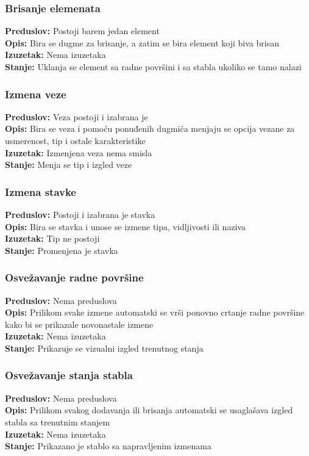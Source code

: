 \documentclass[a4paper]{article}
\begin{document}
\subsubsection{Brisanje elemenata}\noindent
\textbf{Preduslov: }Postoji barem jedan element \\
\textbf{Opis: }Bira se dugme za brisanje, a zatim se bira element koji biva brisan \\
\textbf{Izuzetak: }Nema izuzetaka \\ 
\textbf{Stanje: }Uklanja se element sa radne površini i sa stabla ukoliko se tamo nalazi 
\subsubsection{Izmena veze}\noindent
\textbf{Preduslov: }Veza postoji i izabrana je \\
\textbf{Opis: }Bira se veza i pomoću ponuđenih dugmića menjaju se opcija vezane za usmerenost, tip i ostale karakteristike \\
\textbf{Izuzetak: }Izmenjena veza nema smisla \\ 
\textbf{Stanje: } Menja se tip i izgled veze
\subsubsection{Izmena stavke}\noindent
\textbf{Preduslov: }Postoji i izabrana je stavka \\
\textbf{Opis: }Bira se stavka i unose se izmene tipa, vidljivosti ili naziva \\
\textbf{Izuzetak: }Tip ne postoji \\ 
\textbf{Stanje: }Promenjena je stavka 
\subsubsection{Osvežavanje radne površine}\noindent
\textbf{Preduslov: }Nema preduslova \\
\textbf{Opis: }Prilikom svake izmene automatski se vrši ponovno crtanje radne površine kako bi se prikazale novonastale izmene\\
\textbf{Izuzetak: }Nema izuzetaka \\ 
\textbf{Stanje: }Prikazuje se vizualni izgled trenutnog stanja 
\subsubsection{Osvežavanje stanja stabla}\noindent
\textbf{Preduslov: }Nema preduslova \\
\textbf{Opis: }Prilikom svakog dodavanja ili brisanja automatski se usaglašava izgled stabla sa trenutnim stanjem \\
\textbf{Izuzetak: }Nema izuzetaka \\ 
\textbf{Stanje: }Prikazano je stablo sa napravljenim izmenama 
\end{document}

